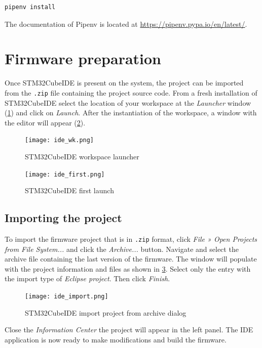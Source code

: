 \begin{verbatim}
pipenv install
\end{verbatim}

The documentation of Pipenv is located at \url{https://pipenv.pypa.io/en/latest/}.


\section{Firmware preparation}

Once STM32CubeIDE is present on the system, the project can be imported from the \texttt{.zip} file containing the project source code. From a fresh installation of STM32CubeIDE select the location of your workspace at the \textit{Launcher} window (\cref{fig:ide_wk}) and click on \textit{Launch}. After the instantiation of the workspace, a window with the editor will appear (\cref{fig:ide_first}).

\begin{figure}[ht]
	\centering
	\texttt{[image: ide\_wk.png]}
	\caption{STM32CubeIDE workspace launcher \label{fig:ide_wk}}
\end{figure}

\begin{figure}[ht]
	\centering
	\texttt{[image: ide\_first.png]}
	\caption{STM32CubeIDE first launch \label{fig:ide_first}}
\end{figure}

\subsection{Importing the project}

To import the firmware project that is in \texttt{.zip} format, click \textit{File » Open Projects from File System...} and click the \textit{Archive...} button. Navigate and select the archive file containing the last version of the firmware. The window will populate with the project information and files as shown in \cref{fig:ide_import}. Select only the entry with the import type of \textit{Eclipse project}. Then click \textit{Finish}.

\begin{figure}[ht]
	\centering
	\texttt{[image: ide\_import.png]}
	\caption{STM32CubeIDE import project from archive dialog \label{fig:ide_import}}
\end{figure}

Close the \textit{Information Center} the project will appear in the left panel. The IDE application is now ready to make modifications and build the firmware.

